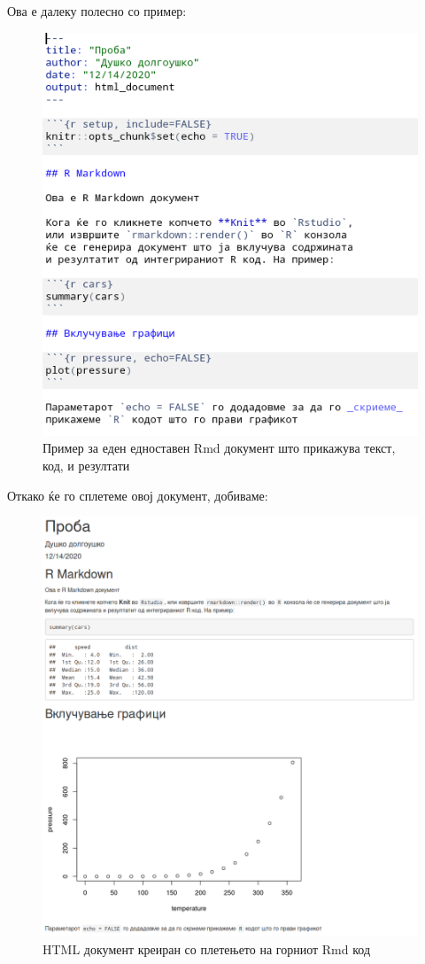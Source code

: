 \documentclass[
]{book}
\begin{document}
Ова е далеку полесно со пример:

\begin{figure}
\centering
\includegraphics{www/rmd.png}
\caption{Пример за еден едноставен Rmd документ што прикажува текст, код, и резултати}
\end{figure}

Откако ќе го сплетеме овој документ, добиваме:

\begin{figure}
\centering
\includegraphics{www/rmd-rendered.png}
\caption{HTML документ креиран со плетењето на горниот Rmd код}
\end{figure}
\end{document}
